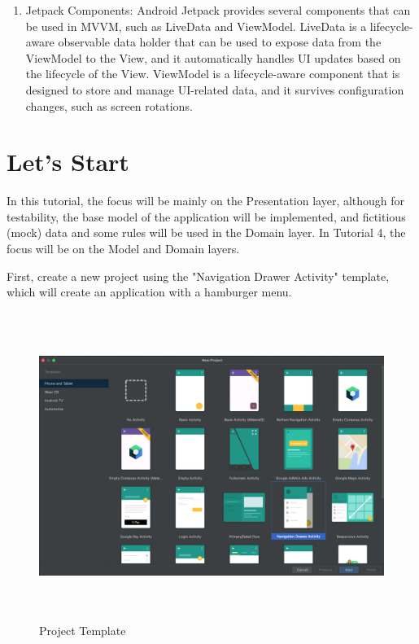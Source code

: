 \documentclass[a4paper, 12pt]{article}
\begin{document}
\begin{enumerate}
    \item Jetpack Components: Android Jetpack provides several components that can be used in MVVM, such as LiveData and ViewModel. 
    LiveData is a lifecycle-aware observable data holder that can be used to expose data from the ViewModel to the View, and it automatically handles UI updates based on the lifecycle of the View. 
    ViewModel is a lifecycle-aware component that is designed to store and manage UI-related data, and it survives configuration changes, such as screen rotations.
    
\end{enumerate}




\section{Let's Start}

In this tutorial, the focus will be mainly on the Presentation layer, although for testability, the base model of the application will be implemented, and fictitious (mock) data and some rules will be used in the Domain layer. In Tutorial 4, the focus will be on the Model and Domain layers.

First, create a new project using the "Navigation Drawer Activity" template, which will create an application with a hamburger menu.

\begin{figure}
	\centering
	\includegraphics[height=10cm]{imgs/project/project_template.png}
	\caption{Project Template}
	\label{fig:pj_template}
\end{figure}
\end{document}
